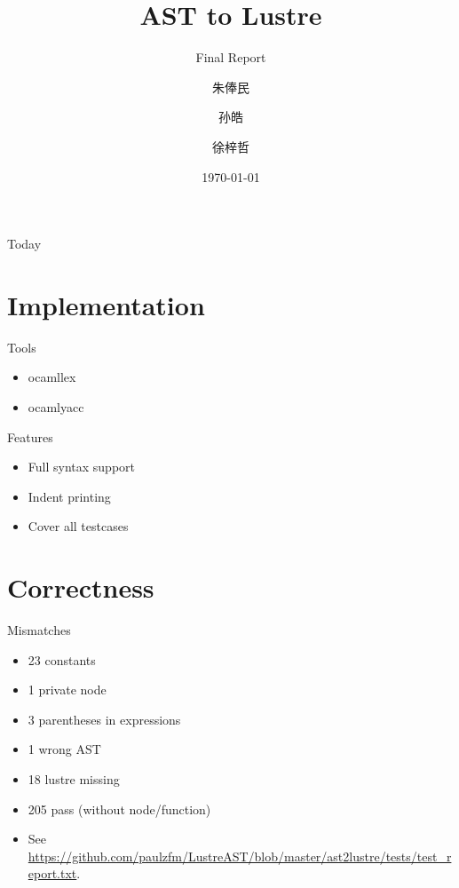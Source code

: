\documentclass{beamer}
\begin{document}
\title{AST to Lustre}
\subtitle{Final Report}
\author[Lambda]{朱俸民 \and 孙皓 \and 徐梓哲}
\date{\today}



\begin{frame}
    \titlepage
\end{frame}

\begin{frame}{Today}
    \tableofcontents
\end{frame}

\section{Implementation}

\begin{frame}{Tools}
    \begin{itemize}
        \item ocamllex
        \item ocamlyacc
    \end{itemize}
\end{frame}

\begin{frame}{Features}
    \begin{itemize}
        \item Full syntax support
        \item Indent printing
        \item Cover all testcases
    \end{itemize}
\end{frame}

\section{Correctness}

\begin{frame}{Mismatches}
    \begin{itemize}
        \item 23 constants
        \item 1 private node
        \item 3 parentheses in expressions
        \item 1 wrong AST
        \item 18 lustre missing
        \item 205 pass (without node/function)
        \item See \url{https://github.com/paulzfm/LustreAST/blob/master/ast2lustre/tests/test_report.txt}.
    \end{itemize}
\end{frame}
\end{document}
